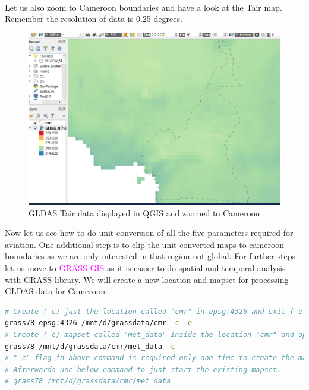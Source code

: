 \paragraph{}
Let us also zoom to Cameroon boundaries and have a look at the Tair map.
Remember the resolution of data is 0.25 degrees.
\begin{figure}[H]
\begin{center}
\includegraphics[scale=0.6]{qgis2.png} %
\end{center}
\caption{GLDAS Tair data displayed in QGIS and zoomed to Cameroon}
\label{GLDAS Tair data displayed in QGIS and zoomed to Cameroon}%
\end{figure}
Now let us see how to do unit conversion of all the five parameters required for aviation. 
One additional step is to clip the unit converted maps to cameroon boundaries as we are only interested in that region not global.
\newline
For further steps let us move to \textcolor{magenta}{GRASS GIS} as it is easier to do spatial and temporal analysis with GRASS library. 
We will create a new location and mapset for processing GLDAS data for Cameroon.
\begin{lstlisting}[language=Bash]
# Create (-c) just the location called "cmr" in epsg:4326 and exit (-e)
grass78 epsg:4326 /mnt/d/grassdata/cmr -c -e
# Create (-c) mapset called "met_data" inside the location "cmr" and open GRASS GIS in "cmr/met_data" mapset
grass78 /mnt/d/grassdata/cmr/met_data -c
# "-c" flag in above command is required only one time to create the mapset met_data
# Afterwards use below command to just start the existing mapset.
# grass78 /mnt/d/grassdata/cmr/met_data
\end{lstlisting}
